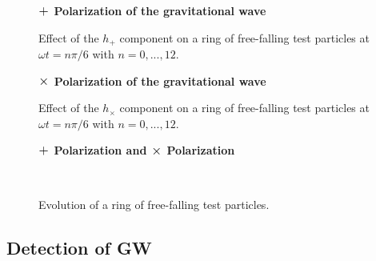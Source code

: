 \begin{figure}
\centering
    \textbf{ $\mathlarger{\mathlarger{+}}$ Polarization of the gravitational wave}\par\medskip
{}
\caption{Effect of the $h_+$ component on a ring of free-falling test particles at $\omega t = n\pi/6 $ with $n=0,...,12$.}
\label{plus_polarization}
\end{figure}

\begin{figure}
\centering
    \textbf{ $\mathlarger{\mathlarger{\times}}$ Polarization of the gravitational wave}\par\medskip
{}
\caption{Effect of the $h_\times$ component on a ring of free-falling test particles at $\omega t = n\pi/6 $ with $n=0,...,12$.}
\end{figure}

\begin{figure}
\centering
    \textbf{ $\mathlarger{\mathlarger{+}}$ Polarization and $\mathlarger{\mathlarger{\times}}$ Polarization}\par\medskip
\centering
{} \quad
{} \\
\caption{Evolution of a ring of free-falling test particles.}
\label{plus_and_times}
\end{figure}





\subsection{Detection of GW}






